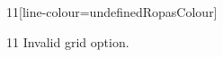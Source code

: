 \documentclass[paper=A4]{ropas-poster}
\begin{document}
\begin{postergrid}{1}{1}[line-colour=undefinedRopasColour]
\begin{posterblock}{1}{1}
Invalid grid option.
\end{posterblock}
\end{postergrid}
\end{document}
